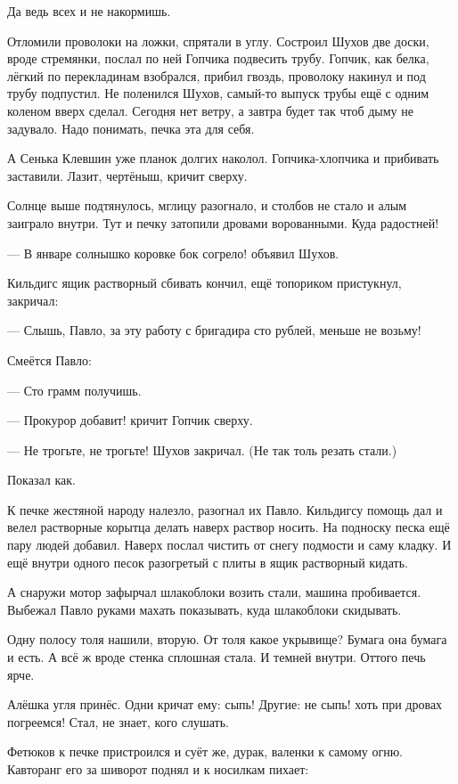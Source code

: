 Да ведь всех и не накормишь.

Отломили проволоки на ложки, спрятали в углу. Состроил Шухов две доски, вроде стремянки,
послал по ней Гопчика подвесить трубу. Гопчик, как белка, лёгкий \dash по перекладинам
взобрался, прибил гвоздь, проволоку накинул и под трубу подпустил. Не поленился Шухов,
самый-то выпуск трубы ещё с одним коленом вверх сделал. Сегодня нет ветру, а завтра будет \dash
так чтоб дыму не задувало. Надо понимать, печка эта \dash для себя.

А Сенька Клевшин уже планок долгих наколол. Гопчика-хлопчика и прибивать заставили. Лазит,
чертёныш, кричит сверху.

Солнце выше подтянулось, мглицу разогнало, и столбов не стало \dash и алым заиграло внутри. Тут и
печку затопили дровами ворованными. Куда радостней!

--- В январе солнышко коровке бок согрело! \dash объявил Шухов.

Кильдигс ящик растворный сбивать кончил, ещё топориком пристукнул, закричал:

--- Слышь, Павло, за эту работу с бригадира сто рублей, меньше не возьму!

Смеётся Павло:

--- Сто грамм получишь.

--- Прокурор добавит! \dash кричит Гопчик сверху.

--- Не трогьте, не трогьте! \dash Шухов закричал. (Не так толь резать стали.)

Показал \dash как.

К печке жестяной народу налезло, разогнал их Павло. Кильдигсу помощь дал и велел растворные
корытца делать \dash наверх раствор носить. На подноску песка ещё пару людей добавил. Наверх
послал \dash чистить от снегу подмости и саму кладку. И ещё внутри одного \dash песок разогретый с
плиты в ящик растворный кидать.

А снаружи мотор зафырчал \dash шлакоблоки возить стали, машина пробивается. Выбежал Павло
руками махать \dash показывать, куда шлакоблоки скидывать.

Одну полосу толя нашили, вторую. От толя \dash какое укрывище? Бумага \dash она бумага и есть. А всё ж
вроде стенка сплошная стала. И \dash темней внутри. Оттого печь ярче.

Алёшка угля принёс. Одни кричат ему: сыпь! Другие: не сыпь! хоть при дровах погреемся! Стал, не
знает, кого слушать.

Фетюков к печке пристроился и суёт же, дурак, валенки к самому огню. Кавторанг его за шиворот
поднял и к носилкам пихает:

